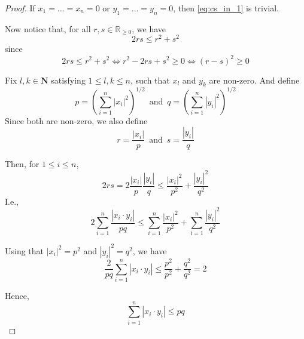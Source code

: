 \begin{proof}
	If $x_1 = \ldots = x_n = 0$ or $y_1 = \ldots = y_n = 0$, then \eqref{eq:cs_in_1} is trivial.

	Now notice that, for all $r, s \in \mathbb{R}_{\geq 0}$, we have
	\begin{equation}\label{eq:cs_in_1_aux}
		2rs \leq r^2 + s^2
	\end{equation}
	since
	\[
		2rs \leq r^2 + s^2 \iff r^2 - 2rs + s^2 \geq 0 \iff (r - s)^2 \geq 0
	\]

	Fix $l, k \in \textbf{N}$ satisfying $1 \leq l, k \leq n$, such that $x_l$ and $y_k$ are non-zero. And define
	\[
		p = \left( \sum_{i=1}^n |x_i|^2 \right)^{1/2} \, \text{ and } \, q = \left( \sum_{i=1}^n |y_i|^2 \right)^{1/2}
	\]
	Since both are non-zero, we also define
	\[
		r = \frac{|x_i|}{p} \, \text{ and } \, s = \frac{|y_i|}{q}
	\]

	Then, for $1 \leq i \leq n$,
	\begin{equation*}
		2rs = 2 \frac{|x_i|}{p} \frac{|y_i|}{q} \leq \frac{|x_i|^2}{p^2} + \frac{|y_i|^2}{q^2}
	\end{equation*}
	I.e.,
	\begin{equation*}
		2 \sum_{i=1}^n \frac{|x_i \cdot y_i|}{pq} \leq \sum_{i=1}^n \frac{|x_i|^2}{p^2}  + \sum_{i=1}^n \frac{|y_i|^2}{q^2}
	\end{equation*}

	Using that $|x_i|^2 = p^2$ and $|y_i|^2 = q^2$, we have
	\begin{equation*}
		\frac{2}{pq} \sum_{i=1}^n |x_i \cdot y_i| \leq \frac{p^2}{p^2} + \frac{q^2}{q^2} = 2
	\end{equation*}

	Hence,
	\begin{equation*}
		\sum_{i=1}^n |x_i \cdot y_i| \leq pq
	\end{equation*}
\end{proof}

